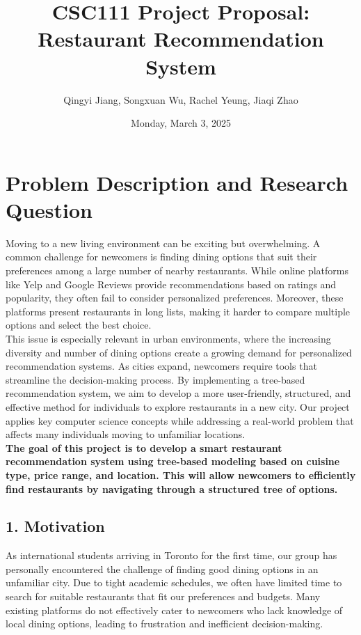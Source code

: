 \documentclass[fontsize=11pt]{article}
\title{CSC111 Project Proposal: Restaurant Recommendation System}
\author{Qingyi Jiang, Songxuan Wu, Rachel Yeung, Jiaqi Zhao}
\date{Monday, March 3, 2025}
\begin{document}
\maketitle

\section*{Problem Description and Research Question}
Moving to a new living environment can be exciting but overwhelming. A common challenge for newcomers is finding dining options that suit their preferences among a large number of nearby restaurants. While online platforms like Yelp and Google Reviews provide recommendations based on ratings and popularity, they often fail to consider personalized preferences. Moreover, these platforms present restaurants in long lists, making it harder to compare multiple options and select the best choice. \\
This issue is especially relevant in urban environments, where the increasing diversity and number of dining options create a growing demand for personalized recommendation systems. As cities expand, newcomers require tools that streamline the decision-making process. By implementing a tree-based recommendation system, we aim to develop a more user-friendly, structured, and effective method for individuals to explore restaurants in a new city. Our project applies key computer science concepts while addressing a real-world problem that affects many individuals moving to unfamiliar locations. \\
\textbf{The goal of this project is to develop a smart restaurant recommendation system using tree-based modeling based on cuisine type, price range, and location. This will allow newcomers to efficiently find restaurants by navigating through a structured tree of options.}

\subsection*{1. Motivation}
As international students arriving in Toronto for the first time, our group has personally encountered the challenge of finding good dining options in an unfamiliar city. Due to tight academic schedules, we often have limited time to search for suitable restaurants that fit our preferences and budgets. Many existing platforms do not effectively cater to newcomers who lack knowledge of local dining options, leading to frustration and inefficient decision-making.
\end{document}
